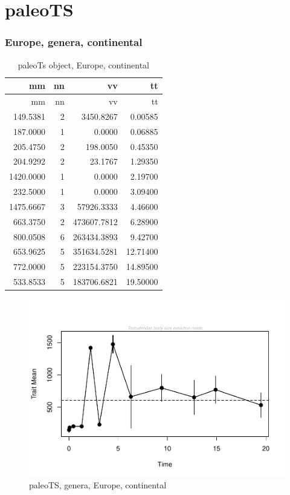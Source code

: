 \section{paleoTS}

\subsubsection*{Europe, genera, continental}\label{europe-genera-continental}

\begin{longtable}[]{@{}rrrr@{}}
	\caption{paleoTs object, Europe, continental}
	\label{tab:pTSEuC}\tabularnewline
	\toprule
	mm & nn & vv & tt\tabularnewline
	\midrule
	\endfirsthead
	\toprule
	mm & nn & vv & tt\tabularnewline
	\midrule
	\endhead
	149.5381 & 2 & 3450.8267 & 0.00585\tabularnewline
	187.0000 & 1 & 0.0000 & 0.06885\tabularnewline
	205.4750 & 2 & 198.0050 & 0.45350\tabularnewline
	204.9292 & 2 & 23.1767 & 1.29350\tabularnewline
	1420.0000 & 1 & 0.0000 & 2.19700\tabularnewline
	232.5000 & 1 & 0.0000 & 3.09400\tabularnewline
	1475.6667 & 3 & 57926.3333 & 4.46600\tabularnewline
	663.3750 & 2 & 473607.7812 & 6.28900\tabularnewline
	800.0508 & 6 & 263434.3893 & 9.42700\tabularnewline
	653.9625 & 5 & 351634.5281 & 12.71400\tabularnewline
	772.0000 & 5 & 223154.3750 & 14.89500\tabularnewline
	533.8533 & 5 & 183706.6821 & 19.50000\tabularnewline
	\bottomrule
\end{longtable}

\begin{figure}[H]
	\centering
	\includegraphics{MA_JJ_files/figure-latex/pTSEuC-1.pdf}
	\caption{paleoTS, genera, Europe, continental}
	\label{fig:pTSEuC}
\end{figure}

